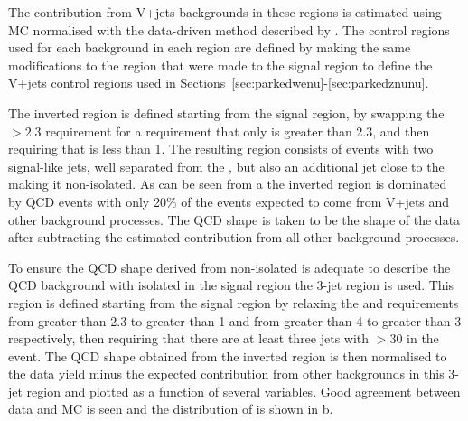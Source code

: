 The contribution from V+jets backgrounds in these regions is estimated using \ac{MC} normalised with the data-driven method described by . The control regions used for each background in each region are defined by making the same modifications to the region that were made to the signal region to define the V+jets control regions used in Sections~\ref{sec:parkedwenu}-\ref{sec:parkedznunu}.

The inverted region is defined starting from the signal region, by swapping the \jetmetdphi$>2.3$ requirement for a requirement that only \jetmetdphileading is greater than 2.3, and then requiring that \jetmetdphi is less than 1. The resulting region consists of events with two signal-like jets, well separated from the \MET, but also an additional jet close to the \MET making it non-isolated.   As can be seen from a the inverted region is dominated by \ac{QCD} events with only 20\% of the events expected to come from V+jets and other background processes. The \ac{QCD} shape is taken to be the shape of the data after subtracting the estimated contribution from all other background processes.


To ensure the \ac{QCD} shape derived from non-isolated \MET is adequate to describe the \ac{QCD} background with isolated \MET in the signal region the 3-jet region is used. This region is defined starting from the signal region by relaxing the \jetmetdphi and \METsig requirements from greater than 2.3 to greater than 1 and from greater than 4 to greater than 3 respectively, then requiring that there are at least three jets with \pt$>30$ \GeV in the event. The \ac{QCD} shape obtained from the inverted region is then normalised to the data yield minus the expected contribution from other backgrounds in this 3-jet region and plotted as a function of several variables. Good agreement between data and \ac{MC} is seen and the distribution of \METsig is shown in b. 


